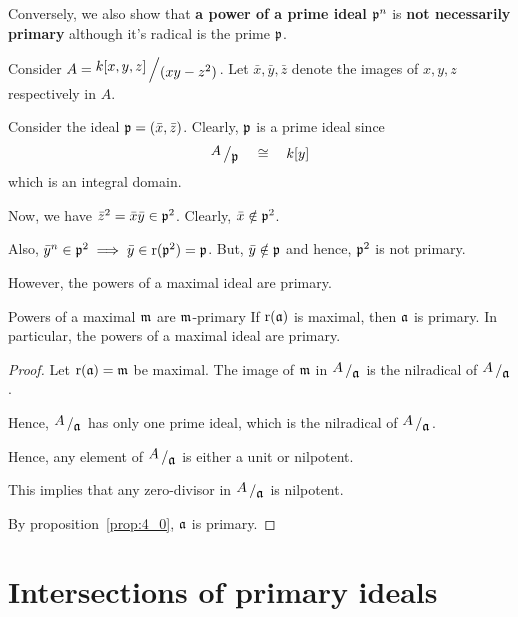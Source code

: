 Conversely, we also show that \textbf{a power of a prime ideal} \({\mathfrak{p}}^n\)
is \textbf{not necessarily primary} although it's radical is the prime \(\mathfrak{p}\).

\begin{example}{}{}
	Consider \(A = \bigslant{k[x, y, z]}{(xy - z^2)}\).
	Let \(\bar{x}, \bar{y}, \bar{z}\) denote the images of \(x, y, z\)
	respectively in \(A\).

	Consider the ideal \(\mathfrak{p} = (\bar{x}, \bar{z})\).
	Clearly, \(\mathfrak{p}\) is a prime ideal since
	\[
		\bigslant{A}{\mfp} \quad \cong \quad k[y]
	\]
	which is an integral domain.

	Now, we have \(\bar{z}^2 = \bar{x}\bar{y} \in \mathfrak{p}^{2}\).
	Clearly, \(\bar{x} \notin \mathfrak{p}^2\).

	Also, \(\bar{y}^n \in \mathfrak{p}^{2} \implies \bar{y} \in \operatorname{r}(\mathfrak{p}^2) = \mathfrak{p}\).
	But, \(\bar{y} \notin \mathfrak{p}\) and hence, \(\mathfrak{p}^2\) is not primary.
\end{example}

However, the powers of a maximal ideal are primary.

\begin{proposition}{Powers of a maximal \(\mathfrak{m}\) are \(\mathfrak{m}\)-primary}{}
\label{prop:4_2}
	If \(\operatorname{r}(\mathfrak{a})\) is maximal, then \(\mathfrak{a}\) is primary.
	In particular, the powers of a maximal ideal are primary.
\end{proposition}
\begin{proof}
	Let \(\operatorname{r}(\mathfrak{a}) = \mathfrak{m}\) be maximal.
	The image of \(\mathfrak{m}\) in  \(\bigslant{A}{\mfa}\) is the
	nilradical of \(\bigslant{A}{\mfa}\).

	Hence, \(\bigslant{A}{\mfa}\) has only one prime ideal, which is the
	nilradical of \(\bigslant{A}{\mfa}\).

	Hence, any element of \(\bigslant{A}{\mfa}\) is either a unit
	or nilpotent.

	This implies that any zero-divisor in \(\bigslant{A}{\mfa}\) is nilpotent.

	By proposition~\ref{prop:4_0}, \(\mathfrak{a}\) is primary.
\end{proof}


\section{Intersections of primary ideals}
\label{sec:4_intersections}


